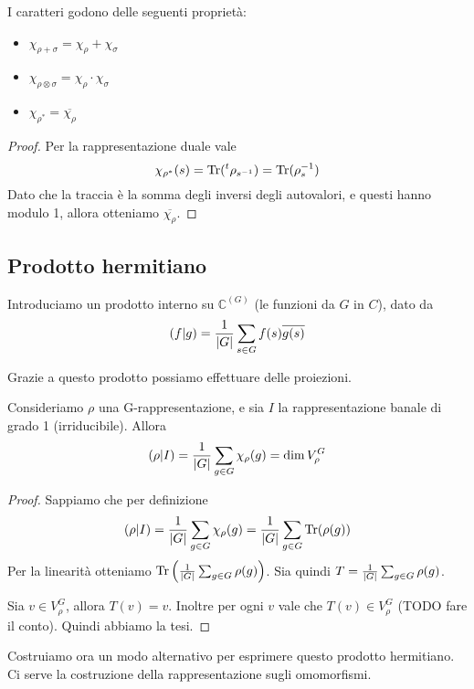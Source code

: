 \documentclass[a4paper,10pt,oneside]{math_article}
\newcommand{\herm}[2]{\left(#1 | #2\right)}
\newcommand{\id}{I}
\let\conj\overline
\begin{document}
    \begin{mylemma}
    I caratteri godono delle seguenti proprietà:
      \begin{itemize}
      \item $\chi_{\rho+\sigma}=\chi_\rho+\chi_\sigma$     
      \item $\chi_{\rho\otimes\sigma}=\chi_\rho\cdot\chi_\sigma$
      \item $\chi_{\rho^*} = \conj{\chi_\rho}$
      \end{itemize}
    \end{mylemma}
    \begin{proof}
     Per la rappresentazione duale vale 
     \[
      \chi_{\rho^*}(s)=\operatorname{Tr} (\prescript{t}{}{\rho}_{s^{-1}})=\operatorname{Tr} (\rho_s^{-1})
     \]
     Dato che la traccia è la somma degli inversi degli autovalori, e questi hanno modulo 1, allora otteniamo $\conj{\chi_\rho}$. 

    \end{proof}

    
    \subsection{Prodotto hermitiano}
    Introduciamo un prodotto interno su $\mathbb C^{(G)}$ (le funzioni da $G$ in $C$), dato da 
    \[
     \herm fg = \frac 1{\abs G} \sum_{s\in G} f(s)\conj{g(s)}
    \]
    
    Grazie a questo prodotto possiamo effettuare delle proiezioni.
    
    \begin{myexample}
     Consideriamo $\rho$ una G-rappresentazione, e sia $\id$ la rappresentazione banale di grado 1 (irriducibile). Allora 
     \[
      \herm \rho\id = \frac 1{\abs G}\sum_{g\in G} \chi_\rho(g) = \dim V_\rho^G
     \]    
    \end{myexample}
    \begin{proof}
     Sappiamo che per definizione
     \[
      \herm \rho\id = \frac 1{\abs G}\sum_{g\in G} \chi_\rho(g) = \frac 1{\abs G}\sum_{g\in G} \Tr(\rho(g)) 
     \]
     Per la linearità otteniamo $\operatorname{Tr}\left(\frac 1{\left|G\right|}\sum_{g\in G}\rho(g)\right)$. Sia quindi $T=\frac 1{\left|G\right|}\sum_{g\in G}\rho(g)$.
     
     Sia $v \in V^G_\rho$, allora $T(v)=v$. Inoltre per ogni $v$ vale che $T(v) \in V^G_\rho$ (TODO fare il conto). Quindi abbiamo la tesi.
     
    \end{proof}
    
    Costruiamo ora un modo alternativo per esprimere questo prodotto hermitiano. Ci serve la costruzione della rappresentazione sugli omomorfismi.
    
\end{document}
